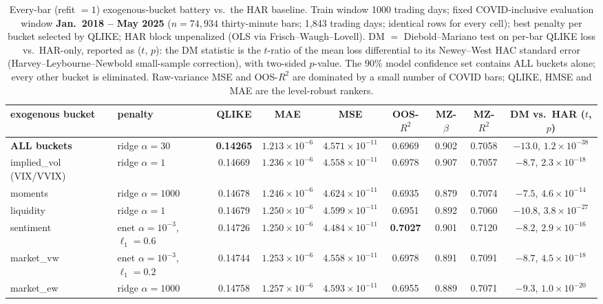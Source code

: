 \begin{table}[t]
\centering
\caption{Every-bar (refit $=1$) exogenous-bucket battery vs.\ the HAR baseline. Train window
1000 trading days; fixed COVID-inclusive evaluation window \textbf{Jan.\ 2018 -- May 2025}
($n = 74{,}934$ thirty-minute bars; 1{,}843 trading days; identical rows for every cell); best
penalty per bucket selected by QLIKE; HAR block unpenalized (OLS via Frisch--Waugh--Lovell).
DM $=$ Diebold--Mariano test on per-bar QLIKE loss vs.\ HAR-only, reported as ($t$, $p$): the
DM statistic is the $t$-ratio of the mean loss differential to its Newey--West HAC standard
error (Harvey--Leybourne--Newbold small-sample correction), with two-sided $p$-value.
The $90\%$ model confidence set contains ALL buckets alone;
every other bucket is eliminated. Raw-variance MSE and OOS-$R^2$ are dominated by a small number
of COVID bars; QLIKE, HMSE and MAE are the level-robust rankers.}
\vspace{4pt}
\footnotesize
\setlength{\tabcolsep}{4pt}
\begin{tabular}{@{}llccccccc@{}}
\toprule
exogenous bucket & penalty & QLIKE & MAE & MSE & OOS-$R^2$ & MZ-$\beta$ & MZ-$R^2$ & DM vs.\ HAR ($t$, $p$) \\
\midrule
\textbf{ALL buckets} & ridge $\alpha{=}30$ & \textbf{0.14265} & $1.213 \times 10^{-6}$ & $4.571 \times 10^{-11}$ & 0.6969 & 0.902 & 0.7058 & $-13.0$, $1.2 \times 10^{-38}$ \\
implied\_vol (VIX/VVIX) & ridge $\alpha{=}1$ & 0.14669 & $1.236 \times 10^{-6}$ & $4.558 \times 10^{-11}$ & 0.6978 & 0.907 & 0.7057 & $-8.7$, $2.3 \times 10^{-18}$ \\
moments & ridge $\alpha{=}1000$ & 0.14678 & $1.246 \times 10^{-6}$ & $4.624 \times 10^{-11}$ & 0.6935 & 0.879 & 0.7074 & $-7.5$, $4.6 \times 10^{-14}$ \\
liquidity & ridge $\alpha{=}1$ & 0.14679 & $1.250 \times 10^{-6}$ & $4.599 \times 10^{-11}$ & 0.6951 & 0.892 & 0.7060 & $-10.8$, $3.8 \times 10^{-27}$ \\
sentiment & enet $\alpha{=}10^{-3}$, $\ell_1{=}0.6$ & 0.14726 & $1.250 \times 10^{-6}$ & $4.484 \times 10^{-11}$ & \textbf{0.7027} & 0.901 & 0.7120 & $-8.2$, $2.9 \times 10^{-16}$ \\
market\_vw & enet $\alpha{=}10^{-3}$, $\ell_1{=}0.2$ & 0.14744 & $1.253 \times 10^{-6}$ & $4.558 \times 10^{-11}$ & 0.6978 & 0.891 & 0.7091 & $-8.7$, $4.5 \times 10^{-18}$ \\
market\_ew & ridge $\alpha{=}1000$ & 0.14758 & $1.257 \times 10^{-6}$ & $4.593 \times 10^{-11}$ & 0.6955 & 0.889 & 0.7071 & $-9.3$, $1.0 \times 10^{-20}$ \\

\end{tabular}
\end{table}
